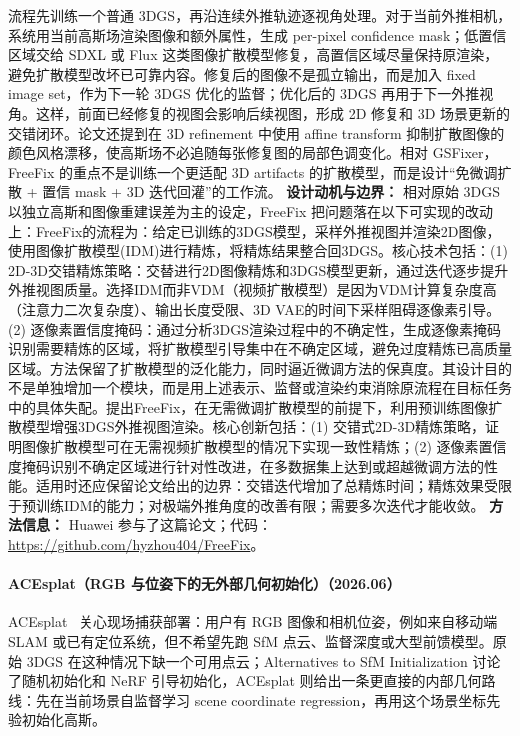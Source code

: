 流程先训练一个普通 3DGS，再沿连续外推轨迹逐视角处理。对于当前外推相机，系统用当前高斯场渲染图像和额外属性，生成 per-pixel confidence mask；低置信区域交给 SDXL 或 Flux 这类图像扩散模型修复，高置信区域尽量保持原渲染，避免扩散模型改坏已可靠内容。修复后的图像不是孤立输出，而是加入 fixed image set，作为下一轮 3DGS 优化的监督；优化后的 3DGS 再用于下一外推视角。这样，前面已经修复的视图会影响后续视图，形成 2D 修复和 3D 场景更新的交错闭环。论文还提到在 3D refinement 中使用 affine transform 抑制扩散图像的颜色风格漂移，使高斯场不必追随每张修复图的局部色调变化。相对 GSFixer，FreeFix 的重点不是训练一个更适配 3D artifacts 的扩散模型，而是设计“免微调扩散 + 置信 mask + 3D 迭代回灌”的工作流。
\textbf{设计动机与边界：} 相对原始 3DGS 以独立高斯和图像重建误差为主的设定，FreeFix 把问题落在以下可实现的改动上：FreeFix的流程为：给定已训练的3DGS模型，采样外推视图并渲染2D图像，使用图像扩散模型(IDM)进行精炼，将精炼结果整合回3DGS。核心技术包括：(1) 2D-3D交错精炼策略：交替进行2D图像精炼和3DGS模型更新，通过迭代逐步提升外推视图质量。选择IDM而非VDM（视频扩散模型）是因为VDM计算复杂度高（注意力二次复杂度）、输出长度受限、3D VAE的时间下采样阻碍逐像素引导。(2) 逐像素置信度掩码：通过分析3DGS渲染过程中的不确定性，生成逐像素掩码识别需要精炼的区域，将扩散模型引导集中在不确定区域，避免过度精炼已高质量区域。方法保留了扩散模型的泛化能力，同时逼近微调方法的保真度。其设计目的不是单独增加一个模块，而是用上述表示、监督或渲染约束消除原流程在目标任务中的具体失配。提出FreeFix，在无需微调扩散模型的前提下，利用预训练图像扩散模型增强3DGS外推视图渲染。核心创新包括：(1) 交错式2D-3D精炼策略，证明图像扩散模型可在无需视频扩散模型的情况下实现一致性精炼；(2) 逐像素置信度掩码识别不确定区域进行针对性改进，在多数据集上达到或超越微调方法的性能。适用时还应保留论文给出的边界：交错迭代增加了总精炼时间；精炼效果受限于预训练IDM的能力；对极端外推角度的改善有限；需要多次迭代才能收敛。
\textbf{方法信息：} Huawei 参与了这篇论文；代码：\url{https://github.com/hyzhou404/FreeFix}。



\paragraph{ACEsplat（RGB 与位姿下的无外部几何初始化）（2026.06）}
ACEsplat~\cite{2606_22091} 关心现场捕获部署：用户有 RGB 图像和相机位姿，例如来自移动端 SLAM 或已有定位系统，但不希望先跑 SfM 点云、监督深度或大型前馈模型。原始 3DGS 在这种情况下缺一个可用点云；Alternatives to SfM Initialization 讨论了随机初始化和 NeRF 引导初始化，ACEsplat 则给出一条更直接的内部几何路线：先在当前场景自监督学习 scene coordinate regression，再用这个场景坐标先验初始化高斯。


